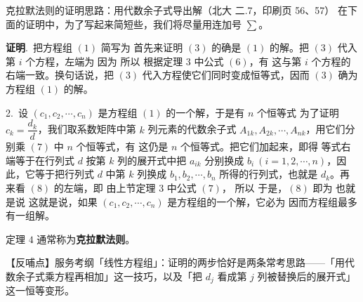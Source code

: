 \begin{fdeep}{克拉默法则的证明思路：用代数余子式导出解（北大 二.7，印刷页 56、57）}
在下面的证明中，为了写起来简短些，我们将尽量用连加号 $\sum$。

\textbf{证明}.\ 把方程组 $(1)$ 简写为
首先来证明 $(3)$ 的确是 $(1)$ 的解。把 $(3)$ 代入第 $i$ 个方程，左端为
因为
所以
根据定理 $3$ 中公式 $(6)$，有
这与第 $i$ 个方程的右端一致。换句话说，把 $(3)$ 代入方程使它们同时变成恒等式，因而 $(3)$ 确为方程组 $(1)$ 的解。

2.\ 设 $(c_1,c_2,\cdots,c_n)$ 是方程组 $(1)$ 的一个解，于是有 $n$ 个恒等式
为了证明 $c_k=\dfrac{d_k}{d}$，我们取系数矩阵中第 $k$ 列元素的代数余子式 $A_{1k},A_{2k},\cdots,A_{nk}$，用它们分别乘 $(7)$ 中 $n$ 个恒等式，有
这仍是 $n$ 个恒等式。把它们加起来，即得
等式右端等于在行列式 $d$ 按第 $k$ 列的展开式中把 $a_{ik}$ 分别换成 $b_i\ (i=1,2,\cdots,n)$，因此，它等于把行列式 $d$ 中第 $k$ 列换成 $b_1,b_2,\cdots,b_n$ 所得的行列式，也就是 $d_k$。再来看 $(8)$ 的左端，即
由上节定理 $3$ 中公式 $(7)$，
所以
于是，$(8)$ 即为
也就是说
这就是说，如果 $(c_1,c_2,\cdots,c_n)$ 是方程组的一个解，它必为
因而方程组最多有一组解。

定理 $4$ 通常称为\textbf{克拉默法则}。

【反哺点】服务考纲「线性方程组」：证明的两步恰好是两条常考思路——「用代数余子式乘方程再相加」这一技巧，以及「把 $d_j$ 看成第 $j$ 列被替换后的展开式」这一恒等变形。
\end{fdeep}

